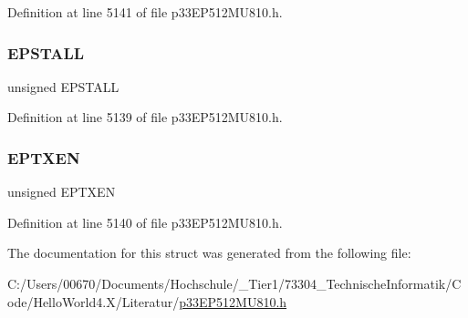 Definition at line 5141 of file p33\+E\+P512\+M\+U810.\+h.

\mbox{\label{structtag_u1_e_p7_b_i_t_s_a47042104f04ebe06a23f9789bd400d7e}} 
\subsubsection{\texorpdfstring{E\+P\+S\+T\+A\+LL}{EPSTALL}}
{\footnotesize\ttfamily unsigned E\+P\+S\+T\+A\+LL}



Definition at line 5139 of file p33\+E\+P512\+M\+U810.\+h.

\mbox{\label{structtag_u1_e_p7_b_i_t_s_aa2d88c1be513e759c136823c86a355b4}} 
\subsubsection{\texorpdfstring{E\+P\+T\+X\+EN}{EPTXEN}}
{\footnotesize\ttfamily unsigned E\+P\+T\+X\+EN}



Definition at line 5140 of file p33\+E\+P512\+M\+U810.\+h.



The documentation for this struct was generated from the following file\+:\begin{DoxyCompactItemize}
\item 
C\+:/\+Users/00670/\+Documents/\+Hochschule/\+\_\+\+Tier1/73304\+\_\+\+Technische\+Informatik/\+Code/\+Hello\+World4.\+X/\+Literatur/\hyperlink{p33_e_p512_m_u810_8h}{p33\+E\+P512\+M\+U810.\+h}\end{DoxyCompactItemize}
